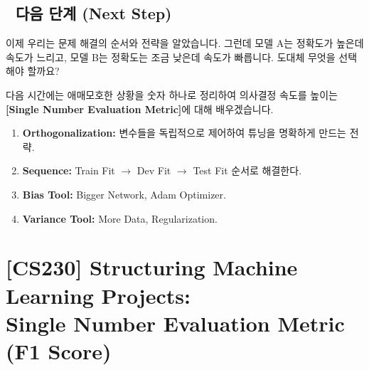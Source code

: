 \documentclass[11pt,a4paper]{book}
\theoremstyle{definition}
\begin{document}
\section*{🔗 다음 단계 (Next Step)}
이제 우리는 문제 해결의 순서와 전략을 알았습니다.
그런데 모델 A는 정확도가 높은데 속도가 느리고, 모델 B는 정확도는 조금 낮은데 속도가 빠릅니다. 도대체 무엇을 선택해야 할까요?

다음 시간에는 애매모호한 상황을 숫자 하나로 정리하여 의사결정 속도를 높이는 \textbf{[Single Number Evaluation Metric]}에 대해 배우겠습니다.

\vspace{0.5cm}

\begin{summarybox}[title={단원 요약 (Cheat Sheet)}]
\begin{enumerate}
    \item \textbf{Orthogonalization:} 변수들을 독립적으로 제어하여 튜닝을 명확하게 만드는 전략.
    \item \textbf{Sequence:} Train Fit $\to$ Dev Fit $\to$ Test Fit 순서로 해결한다.
    \item \textbf{Bias Tool:} Bigger Network, Adam Optimizer.
    \item \textbf{Variance Tool:} More Data, Regularization.
\end{enumerate}
\end{summarybox}


\chapter{[CS230] Structuring Machine Learning Projects: \\ Single Number Evaluation Metric (F1 Score)}
\label{ch:lecture23}

\end{document}
